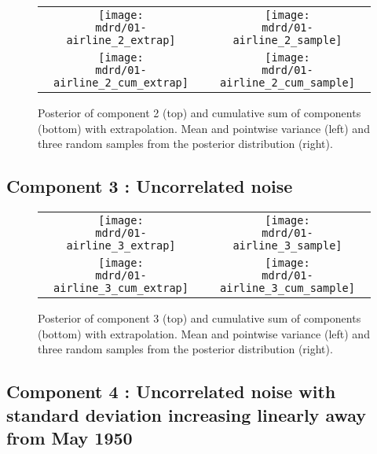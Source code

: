 \documentclass{article} %
\begin{document}


\begin{figure}[H]
\newcommand{\wmgd}{0.5\columnwidth}
\newcommand{\hmgd}{3.0cm}
\newcommand{\mdrd}{01-airline}
\newcommand{\mbm}{\hspace{-0.3cm}}
\begin{tabular}{cc}
\mbm \texttt{[image: \\mdrd/01-airline\_2\_extrap]} & \texttt{[image: \\mdrd/01-airline\_2\_sample]} \\
\mbm \texttt{[image: \\mdrd/01-airline\_2\_cum\_extrap]} & \texttt{[image: \\mdrd/01-airline\_2\_cum\_sample]}
\end{tabular}
\caption{Posterior of component 2 (top) and cumulative sum of components (bottom) with extrapolation. Mean and pointwise variance (left) and three random samples from the posterior distribution (right).}
\label{fig:extrap2}
\end{figure}

\subsection{Component 3 : Uncorrelated noise}



\begin{figure}[H]
\newcommand{\wmgd}{0.5\columnwidth}
\newcommand{\hmgd}{3.0cm}
\newcommand{\mdrd}{01-airline}
\newcommand{\mbm}{\hspace{-0.3cm}}
\begin{tabular}{cc}
\mbm \texttt{[image: \\mdrd/01-airline\_3\_extrap]} & \texttt{[image: \\mdrd/01-airline\_3\_sample]} \\
\mbm \texttt{[image: \\mdrd/01-airline\_3\_cum\_extrap]} & \texttt{[image: \\mdrd/01-airline\_3\_cum\_sample]}
\end{tabular}
\caption{Posterior of component 3 (top) and cumulative sum of components (bottom) with extrapolation. Mean and pointwise variance (left) and three random samples from the posterior distribution (right).}
\label{fig:extrap3}
\end{figure}

\subsection{Component 4 : Uncorrelated noise with standard deviation increasing linearly away from May 1950}
\end{document}
